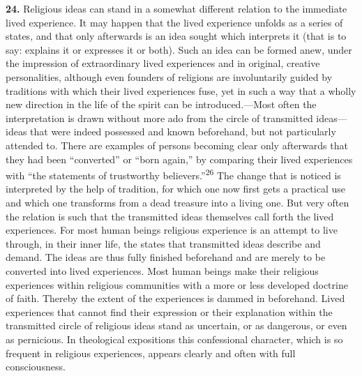 \documentclass[12pt,a4paper]{book}
\newcommand{\opage}[1]{\marginnote{\footnotesize\textit{[#1]}}}
\begin{document}
\noindent\textbf{24.} Religious ideas can stand in a somewhat different
relation to the immediate lived experience. It may happen that the lived
experience unfolds as a series of states, and that only afterwards is an idea
sought which interprets it (that is to say: explains it or expresses it or
both). Such an idea can be formed anew, under the impression of extraordinary
lived experiences and in original, creative personalities, although even
founders of religions are involuntarily guided by traditions with which their
lived experiences fuse, yet in such a way that a wholly new direction in the
life of the spirit can be introduced.---Most often the interpretation is drawn
without more ado from the circle of transmitted ideas---ideas that were indeed
possessed and known beforehand, but not particularly attended to. There are
examples of persons becoming clear only afterwards that they had been
``converted'' or ``born again,'' by comparing their lived experiences with
``the statements of trustworthy believers.''\textsuperscript{26} The change
that is noticed is interpreted by the help of tradition, for which one now
first gets a practical use and which one transforms from a dead treasure into a
living one. But very often the relation is such that the transmitted ideas
themselves call forth the lived experiences. For most human beings religious
experience is an attempt to live through, in their inner life, the states that
transmitted ideas describe and demand. The ideas are thus fully finished
beforehand and are merely to be converted into lived experiences. Most human
beings make their religious experiences within religious communities with a
more or less developed doctrine of faith. Thereby the extent of the experiences
is dammed in beforehand. Lived experiences that cannot find their expression or
their explanation within the transmitted circle of religious ideas stand as
uncertain, or as dangerous, or even as 
\opage{60}pernicious. In theological expositions
this confessional character, which is so frequent in religious experiences,
appears clearly and often with full consciousness.
\end{document}
